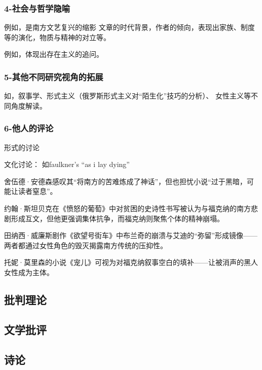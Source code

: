 \documentclass[UTF8]{../../RepresentationUniverse}
\begin{document}
\subsubsection{4-社会与哲学隐喻}

例如，是南方文艺复兴的缩影
文章的时代背景，作者的倾向，表现出家族、制度等的演化，物质与精神的对立等。

例如，体现出存在主义的追问。

\subsubsection{5-其他不同研究视角的拓展}

如，叙事学、形式主义（俄罗斯形式主义对“陌生化”技巧的分析）、
女性主义等不同角度解读。


\subsubsection{6-他人的评论}

形式的讨论


文化讨论：
如faulkner's “as i lay dying”

舍伍德·安德森感叹其“将南方的苦难炼成了神话”，但也担忧小说“过于黑暗，可能让读者窒息”。

约翰·斯坦贝克在《愤怒的葡萄》中对贫困的史诗性书写被认为与福克纳的南方悲剧形成互文，但他更强调集体抗争，而福克纳则聚焦个体的精神崩塌。

田纳西·威廉斯剧作《欲望号街车》中布兰奇的崩溃与艾迪的“弥留”形成镜像——两者都通过女性角色的毁灭揭露南方传统的压抑性。

托妮·莫里森的小说《宠儿》可视为对福克纳叙事空白的填补——让被消声的黑人女性成为主体。




    \subsection{批判理论}
    \subsection{文学批评}
    \subsection{诗论}







 
\end{document}
